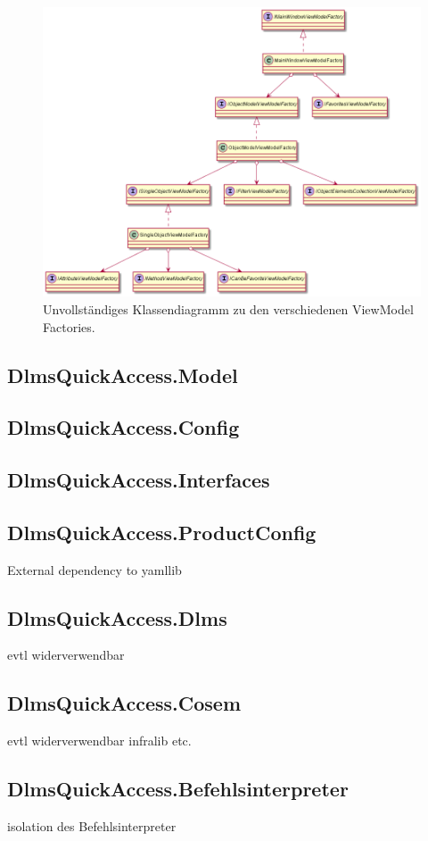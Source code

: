 \begin{figure}[H]
   \centering
   \includegraphics[width=1.0\textwidth]{gfx/vmfactories.png}
   \caption{
      Unvollständiges Klassendiagramm zu den verschiedenen ViewModel Factories.
      }
   \label{fig:vmfactories}
\end{figure}

\subsection{DlmsQuickAccess.Model}


\subsection{DlmsQuickAccess.Config}\label{dqa:config}

\subsection{DlmsQuickAccess.Interfaces}

\subsection{DlmsQuickAccess.ProductConfig}
External dependency to yamllib


\subsection{DlmsQuickAccess.Dlms}
evtl widerverwendbar

\subsection{DlmsQuickAccess.Cosem}
evtl widerverwendbar
infralib etc.

\subsection{DlmsQuickAccess.Befehlsinterpreter}
isolation des Befehlsinterpreter

